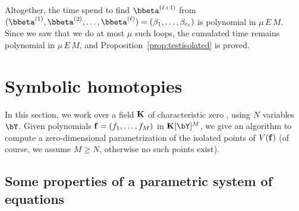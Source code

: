 \documentclass[12pt]{article}
\begin{document}
Altogether, the time spend to find $\bbeta^{(\ell+1)}$ from
$(\bbeta^{(1)},\bbeta^{(2)},\dots,\bbeta^{(\ell)})=(\beta_{1},\dots,\beta_{e_\ell})$
is polynomial in $\mu\,E\,M$. Since we saw that we do at most $\mu$
such loops, the cumulated time remains polynomial in $\mu\,E\,M$, and
Proposition~\ref{prop:testisolated} is proved.


\section{Symbolic homotopies}

In this section, we work over a field $\mathbf{K}$ of characteristic zero
, using $N$ variables $\bY$. Given
polynomials $\mathbf{f}=(f_1,\dots,f_M)$ in $\KK[\bY]^M$, we give an algorithm
to compute a zero-dimensional parametrization of the isolated points
of $V(\mathbf{f})$ (of course, we assume $M\ge N$, otherwise no such points
exist).


\subsection{Some properties of a parametric system of equations}
\end{document}
